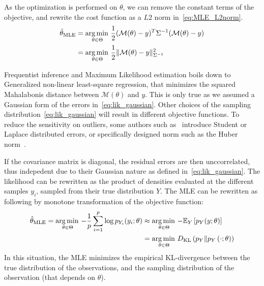 \documentclass[../../Main_ManuscritThese.tex]{subfiles}
\begin{document}
As the optimization is performed on $\theta$, we can remove the constant terms of the objective, and rewrite the cost function as a $L2$ norm in~\cref{eq:MLE_L2norm}.  %
  \begin{align}
    \hat{\theta}_{\mathrm{MLE}} &= \operatorname*{arg\,min \,}_{\theta \in \Theta}\frac{1}{2}(\mathcal{M}(\theta) - y)^T\Sigma^{-1}(\mathcal{M}(\theta) - y) \nonumber\\
                           &= \operatorname*{arg\,min \,}_{\theta \in \Theta}\frac12 \| \mathcal{M}(\theta) - y \|^2_{\Sigma^{-1}} \label{eq:MLE_L2norm}
  \end{align}

  Frequentist inference and Maximum Likelihood estimation boils down to Generalized non-linear least-square regression, that minimizes the squared Mahalabonis distance between $\mathcal{M}({\theta})$ and $y$. This is only true as we assumed a Gaussian form of the errors in~\cref{eq:lik_gaussian}. Other choices of the sampling distribution~\cref{eq:lik_gaussian} will result in different objective functions. To reduce the sensitivity on outliers, some authors such as~\cite{rao_robust_2015} introduce Student or Laplace distributed errors, or specifically designed norm such as the Huber norm~\cite{huber_robust_2011}.

  If the covariance matrix is diagonal, the residual errors are then unccorrelated, thus indepedent due to their Gaussian nature as defined in~\cref{eq:lik_gaussian}. The likelihood can be rewritten as the product of densities evaluated at the different samples $y_i$, sampled from their true distribution $Y$. The MLE can be rewritten as following by monotone transformation of the objective function:
\begin{align}
  \hat{\theta}_{\mathrm{MLE}} = \operatorname*{arg\,min \,}_{\theta \in \Theta} -\frac{1}{p} \sum_{i=1}^p\log p_{Y_i}(y_i;\theta) &\approx \operatorname*{arg\,min \,}_{\theta \in \Theta} -\mathbb{E}_{Y}\left[p_{Y}(y ; \theta)\right]  \\
                                                                                                                         &= \operatorname*{arg\,min \,}_{\theta \in\Theta} D_{\mathrm{KL}}\left(p_Y \| p_Y\left(\cdot;\theta \right)\right)
\end{align}
In this situation, the MLE minimizes the empirical KL-divergence between the true distribution of the observations, and the sampling distribution of the observation (that depends on $\theta$).
\end{document}

